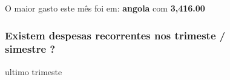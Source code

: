 \documentclass[
  8pt,
  a4paper,
  DIV=11,
  numbers=noendperiod]{scrartcl}
\begin{document}
\begin{figure}
\begin{minipage}{0.50\linewidth}
O maior gasto este mês foi em: \textbf{angola} com \textbf{3,416.00}

\end{minipage}%

\end{figure}%

\begin{figure}

\begin{minipage}{0.50\linewidth}

\subsubsection{Existem despesas recorrentes nos trimeste / simestre
?}\label{existem-despesas-recorrentes-nos-trimeste-simestre}

ultimo trimeste\end{minipage}%
%
\begin{minipage}{0.50\linewidth}

\end{minipage}%
\newline
\begin{minipage}{0.50\linewidth}


\end{minipage}
\end{figure}
\end{document}
